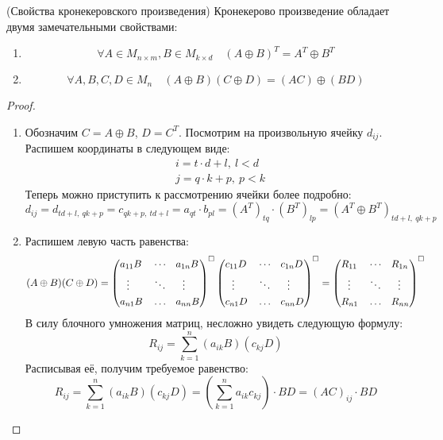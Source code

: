 \begin{proposition} (Свойства кронекеровского произведения)
	Кронекерово произведение обладает двумя замечательными свойствами:
	\begin{enumerate}
		\item \[
			\forall A \in M_{n \times m}, B \in M_{k \times d} \quad (A \oplus B)^T = A^T \oplus B^T
		\]
		
		\item \[
			\forall A, B, C, D \in M_n \quad (A \oplus B) (C \oplus D) = (AC) \oplus (BD)
		\]
	\end{enumerate}
\end{proposition}

\begin{proof}~
	\begin{enumerate}
		\item Обозначим $C = A \oplus B$, $D = C^T$. Посмотрим на произвольную ячейку $d_{ij}$. Распишем координаты в следующем виде:
		\begin{align*}
			&{i = t \cdot d + l,\ l < d}
			\\
			&{j = q \cdot k + p,\ p < k}
		\end{align*}
		Теперь можно приступить к рассмотрению ячейки более подробно:
		\[
			d_{ij} = d_{td + l,\ qk + p} = c_{qk + p,\ td + l} = a_{qt} \cdot b_{pl} = (A^T)_{tq} \cdot (B^T)_{lp} = (A^T \oplus B^T)_{td + l,\ qk + p}
		\]
		
		\item Распишем левую часть равенства:
		\[
			(A \oplus B)(C \oplus D) = \left(\begin{aligned}
				&a_{11} B & &\cdots & &a_{1n} B \\
				&\ \ \vdots & & \ddots & &\ \ \vdots \\
				&a_{n1} B & & \ldots & & a_{nn} B
			\end{aligned}\right)^\square
			\left(\begin{aligned}
				&c_{11} D & &\cdots & &c_{1n} D \\
				&\ \ \vdots & & \ddots & &\ \ \vdots \\
				&c_{n1} D & & \ldots & & c_{nn} D
			\end{aligned}\right)^\square
			= \left(\begin{aligned}
				&R_{11} & &\cdots & &R_{1n} \\
				&\ \ \vdots & & \ddots & &\ \ \vdots \\
				&R_{n1} & & \ldots & & R_{nn}
			\end{aligned}\right)^\square
		\]
		В силу блочного умножения матриц, несложно увидеть следующую формулу:
		\[
			R_{ij} = \sum_{k = 1}^n (a_{ik} B)(c_{kj} D)
		\]
		Расписывая её, получим требуемое равенство:
		\[
			R_{ij} = \sum_{k = 1}^n (a_{ik} B)(c_{kj} D) = \left(\sum_{k = 1}^n a_{ik} c_{kj}\right) \cdot BD = (AC)_{ij} \cdot BD
		\]
	\end{enumerate}
\end{proof}

